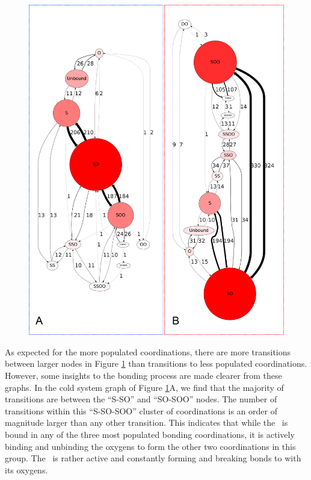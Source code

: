 \begin{figure}[h!]
	\begin{center}
		\includegraphics[scale=1.0]{images/coordinations/coordination-transitions.png}
		\caption{}
		\label{fig:coordination-transitions}
	\end{center}
\end{figure}

As expected for the more populated coordinations, there are more transitions between larger nodes in Figure \ref{fig:coordination-transitions} than transitions to less populated coordinations. However, some insights to the bonding process are made clearer from these graphs. In the cold system graph of Figure \ref{fig:coordination-transitions}A, we find that the majority of transitions are between the ``S-SO'' and ``SO-SOO'' nodes. The number of transitions within this ``S-SO-SOO'' cluster of coordinations is an order of magnitude larger than any other transition. This indicates that while the \suldiox~is bound in any of the three most populated bonding coordinations, it is actively binding and unbinding the oxygens to form the other two coordinations in this group. The \suldiox~is rather active and constantly forming and breaking bonds to with its oxygens.

